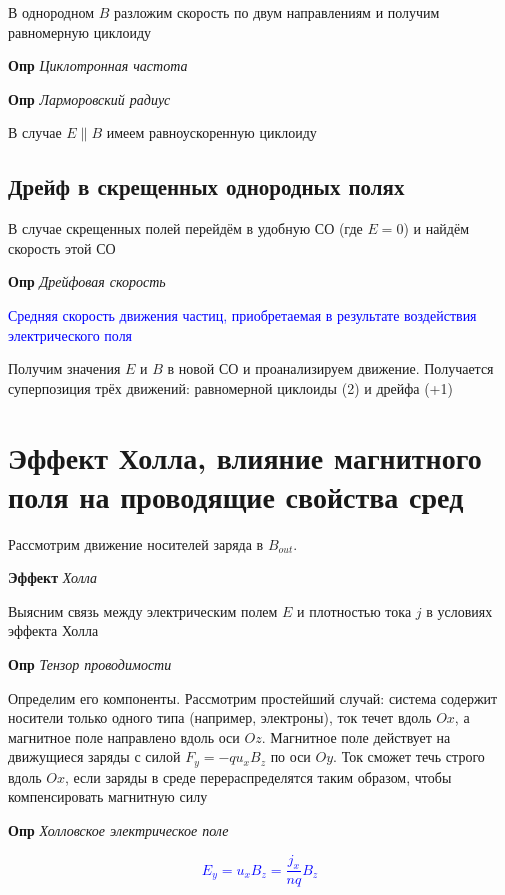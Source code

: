 \documentclass[a4paper, 14pt]{article}
\begin{document}
    В однородном $B$ разложим скорость по двум направлениям и получим равномерную циклоиду
    
    \textbf{Опр} \textit{Циклотронная частота}
    
    \textbf{Опр} \textit{Ларморовский радиус}
    
    В случае $E \| B$ имеем равноускоренную циклоиду
    
    \subsection{Дрейф в скрещенных однородных полях}
    
    В случае скрещенных полей перейдём в удобную СО (где $E = 0$) и найдём скорость этой СО
    
    \textbf{Опр} \textit{Дрейфовая скорость}
    
    \textcolor{blue}{Средняя скорость движения частиц, приобретаемая в результате воздействия электрического поля}
    
    Получим значения $E$ и $B$ в новой СО и проанализируем движение.
    Получается суперпозиция трёх движений: равномерной циклоиды (2) и дрейфа (+1)
    
    \section{Эффект Холла, влияние магнитного поля на проводящие свойства сред}
    
    Рассмотрим движение носителей заряда в $B_{out}$.
    
    \textbf{Эффект} \textit{Холла}
    
    Выясним связь между электрическим полем $E$ и плотностью тока $j$ в условиях эффекта Холла
    
    \textbf{Опр} \textit{Тензор проводимости}
    
    Определим его компоненты.
    Рассмотрим простейший случай: система содержит носители только одного типа (например, электроны), ток течет вдоль
    $Ox$, а магнитное поле направлено вдоль оси $Oz$.
    Магнитное поле действует на движущиеся заряды с силой $F_y = -q u_x B_z$ по оси $Oy$.
    Ток сможет течь строго вдоль $Ox$, если заряды в среде перераспределятся таким образом, чтобы компенсировать
    магнитную силу
    
    \textbf{Опр} \textit{Холловское электрическое поле}
    
    \textcolor{blue}{\[ E_y = u_x B_z = \frac{j_x}{nq} B_z \]}
    
\end{document}
